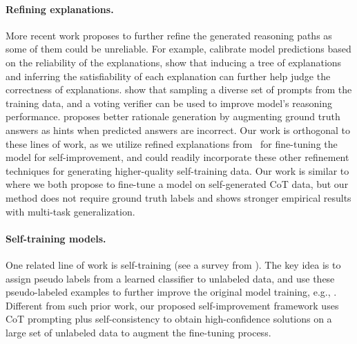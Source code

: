 \paragraph{Refining explanations.}
More recent work proposes to further refine the generated reasoning paths as some of them could be unreliable. For example, \citet{ye2022unreliability} calibrate model predictions based on the reliability of the explanations, \citet{maieutic_prompting} show that inducing a tree of explanations and inferring the satisfiability of each explanation can further help judge the correctness of explanations.
\citet{better_reasoner} show that sampling a diverse set of prompts from the training data, and a voting verifier can be used to improve model's reasoning performance.
\citet{star} proposes better rationale generation by augmenting ground truth answers as hints when predicted answers are incorrect. %
Our work is orthogonal to these lines of work, as we utilize refined explanations from~\citet{Wang2022SelfConsistencyIC} for fine-tuning the model for self-improvement, and could readily incorporate these other refinement techniques for generating higher-quality self-training data. Our work is similar to \citet{star} where we both propose to fine-tune a model on self-generated CoT data, but our method does not require ground truth labels and shows stronger empirical results with multi-task generalization.

\paragraph{Self-training models.}
One related line of work is self-training (see a survey from \citet{self-training-survey}). The key idea is to assign pseudo labels from a learned classifier to unlabeled data, and use these pseudo-labeled examples to further improve the original model training, e.g., \citep{DBLP:conf/cvpr/RoyChowdhuryCSJ19,self_training_xie,He2020Revisiting,chen2021-CPS}.
Different from such prior work, our proposed self-improvement framework uses CoT prompting plus self-consistency to obtain high-confidence solutions on a large set of unlabeled data to augment the fine-tuning process. 

